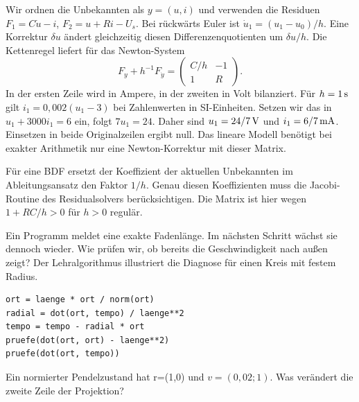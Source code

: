 Wir ordnen die Unbekannten als \(y=(u,i)\) und verwenden die Residuen \(F_1=C\dot u-i\), \(F_2=u+Ri-U_s\). Bei rückwärts Euler ist \(\dot u_1=(u_1-u_0)/h\). Eine Korrektur \(\delta u\) ändert gleichzeitig diesen Differenzenquotienten um \(\delta u/h\). Die Kettenregel liefert für das Newton-System
\[
 F_y+h^{-1}F_{\dot y}=
 \begin{pmatrix}C/h&-1\\1&R\end{pmatrix}.
\]
In der ersten Zeile wird in Ampere, in der zweiten in Volt bilanziert. Für \(h=1\,\mathrm{s}\) gilt \(i_1=0{,}002(u_1-3)\) bei Zahlenwerten in SI-Einheiten. Setzen wir das in \(u_1+3000i_1=6\) ein, folgt \(7u_1=24\). Daher sind \(u_1=24/7\,\mathrm{V}\) und \(i_1=6/7\,\mathrm{mA}\). Einsetzen in beide Originalzeilen ergibt null. Das lineare Modell benötigt bei exakter Arithmetik nur eine Newton-Korrektur mit dieser Matrix.

Für eine BDF ersetzt der Koeffizient der aktuellen Unbekannten im Ableitungsansatz den Faktor \(1/h\). Genau diesen Koeffizienten muss die Jacobi-Routine des Residualsolvers berücksichtigen. Die Matrix ist hier wegen \(1+RC/h>0\) für \(h>0\) regulär.

Ein Programm meldet eine exakte Fadenlänge. Im nächsten Schritt wächst sie dennoch wieder. Wie prüfen wir, ob bereits die Geschwindigkeit nach außen zeigt? Der Lehralgorithmus illustriert die Diagnose für einen Kreis mit festem Radius.
{\small\begin{verbatim}
ort = laenge * ort / norm(ort)
radial = dot(ort, tempo) / laenge**2
tempo = tempo - radial * ort
pruefe(dot(ort, ort) - laenge**2)
pruefe(dot(ort, tempo))
\end{verbatim}}
Ein normierter Pendelzustand hat r=(1,0) und \(v=(0{,}02;1)\). Was verändert die zweite Zeile der Projektion?
